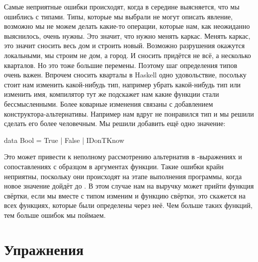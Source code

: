 Самые неприятные ошибки происходят, когда в середине выясняется,
что мы ошиблись с типами. Типы, которые мы выбрали не могут
описать явление, возможно мы не можем делать какие-то
операции, которые нам, как неожиданно выяснилось, очень нужны.
Это значит, что нужно менять каркас.
Менять каркас, это значит сносить весь дом и строить новый.
Возможно разрушения окажутся локальными, мы строим не дом,
а город. И сносить придётся не всё, а несколько кварталов.
Но это тоже большие перемены.
Поэтому шаг определения типов очень важен.
Впрочем сносить кварталы в Haskell одно удовольствие, посольку
стоит нам изменить какой-нибудь тип, например убрать какой-нибудь
тип или изменить имя, компилятор тут же подскажет нам какие
функции стали бессмысленными. Более коварные изменения
связаны с добавлением конструктора-альтернативы. Например
нам вдруг не понравился тип  и мы решили сделать
его более человечным. Мы решили добавить ещё одно значение:

\begin{code}
data Bool = True | False | IDonTKnow
\end{code}

Это может привести к неполному рассмотрению альтернатив в
-выражениях и сопоставлениях с образцом в аргументах
функции. Такие ошибки крайн неприятны, поскольку они
происходят на этапе выполнения программы, когда новое значение 
дойдёт до . В этом случае нам на выручку может прийти функция
свёртки, если мы вместе с типом изменим и функцию свёртки,
это скажется на всех функциях, которые были определены через неё.
Чем больше таких функций, тем больше ошибок мы поймаем.

\section{Упражнения}

